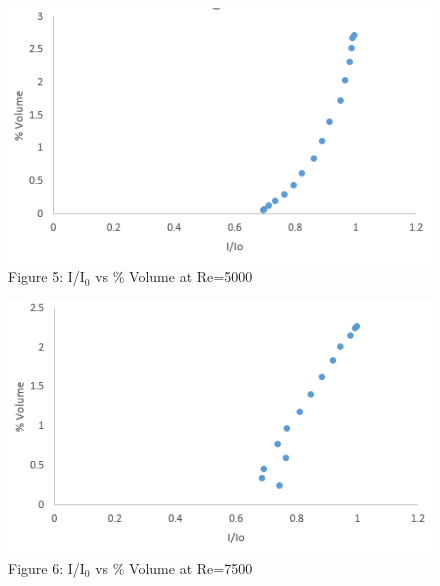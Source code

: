 \documentclass{article}
\begin{document}
\begin{figure}[h]
    \centering
    \includegraphics[width=.7\textwidth]{LAB1_5000_IoVSVol.PNG}
    \caption*{\footnotesize{Figure 5: I/I$_0$ vs \% Volume at Re=5000}}
\end{figure}
\begin{figure}[h]
    \centering
    \includegraphics[width=.7\textwidth]{LAB1_7500_IoVSVol.PNG}
    \caption*{\footnotesize{Figure 6: I/I$_0$ vs \% Volume at Re=7500}}
\end{figure}
\end{document}
